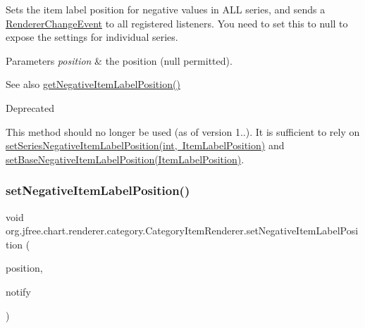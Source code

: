 Sets the item label position for negative values in A\+LL series, and sends a \mbox{\hyperlink{}{Renderer\+Change\+Event}} to all registered listeners. You need to set this to {\ttfamily null} to expose the settings for individual series.


\begin{DoxyParams}{Parameters}
{\em position} & the position ({\ttfamily null} permitted).\\
\hline
\end{DoxyParams}
\begin{DoxySeeAlso}{See also}
\mbox{\hyperlink{interfaceorg_1_1jfree_1_1chart_1_1renderer_1_1category_1_1_category_item_renderer_a3e5a51575b8547693b2ad6a91d2a1fce}{get\+Negative\+Item\+Label\+Position()}}
\end{DoxySeeAlso}
\begin{DoxyRefDesc}{Deprecated}
\item[\mbox{\hyperlink{deprecated__deprecated000178}{Deprecated}}]This method should no longer be used (as of version 1..). It is sufficient to rely on \mbox{\hyperlink{interfaceorg_1_1jfree_1_1chart_1_1renderer_1_1category_1_1_category_item_renderer_ae3201c328eb9526f806b12183f187742}{set\+Series\+Negative\+Item\+Label\+Position(int, Item\+Label\+Position)}} and \mbox{\hyperlink{interfaceorg_1_1jfree_1_1chart_1_1renderer_1_1category_1_1_category_item_renderer_afb74d6ac68ab31c59eb4654edebe2bf6}{set\+Base\+Negative\+Item\+Label\+Position(\+Item\+Label\+Position)}}. \end{DoxyRefDesc}
\mbox{\label{interfaceorg_1_1jfree_1_1chart_1_1renderer_1_1category_1_1_category_item_renderer_ab9b5e5946972d182e0052ea2fffe35a8}} 
\subsubsection{\texorpdfstring{set\+Negative\+Item\+Label\+Position()}{setNegativeItemLabelPosition()}\hspace{0.1cm}{\footnotesize\ttfamily [2/2]}}
{\footnotesize\ttfamily void org.\+jfree.\+chart.\+renderer.\+category.\+Category\+Item\+Renderer.\+set\+Negative\+Item\+Label\+Position (\begin{DoxyParamCaption}\item[{\mbox{\hyperlink{classorg_1_1jfree_1_1chart_1_1labels_1_1_item_label_position}{Item\+Label\+Position}}}]{position,  }\item[{boolean}]{notify }\end{DoxyParamCaption})}

